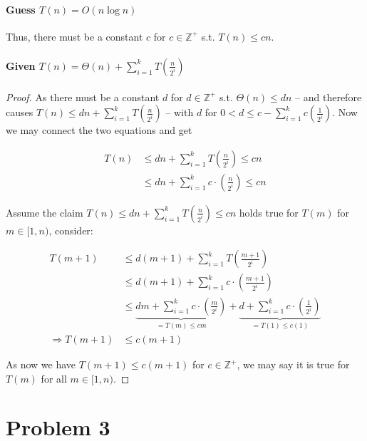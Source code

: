 \documentclass[11pt]{article}
\begin{document}
\paragraph{Guess $T(n) = O(n \log n)$\newline}
Thus, there must be a constant $c$ for $c \in \mathbb{Z^+}$ s.t. $T(n) \leq cn$.

\paragraph{Given $T(n) = \Theta(n) + \sum^{k}_{i = 1} T(\frac{n}{2^i})$\newline}
\begin{proof}
As there must be a constant $d$ for $d \in \mathbb{Z^+}$ s.t. $\Theta(n) \leq dn$ -- and therefore causes $T(n) \leq dn + \sum^{k}_{i = 1} T(\frac{n}{2^i})$ -- with $d$ for $0 < d \leq c - \sum^{k}_{i = 1} c(\frac{1}{2^i})$. Now we may connect the two equations and get

\begin{align}
    T(n) &\leq dn + \sum^{k}_{i = 1} T(\frac{n}{2^i}) \leq cn \\
    &\leq dn + \sum^{k}_{i = 1} c \cdot (\frac{n}{2^i}) \leq cn \nonumber
\end{align}

Assume the claim $T(n) \leq dn + \sum^{k}_{i = 1} T(\frac{n}{2^i}) \leq cn$ holds true for $T(m)$ for $m \in [1, n)$, consider:

\begin{align}
    T(m+1) &\leq d(m + 1) + \sum^{k}_{i = 1} T(\frac{m+1}{2^i}) \\
    &\leq d(m + 1) + \sum^{k}_{i = 1} c \cdot (\frac{m+1}{2^i}) \nonumber \\
    &\leq \underbrace{dm + \sum^{k}_{i = 1} c \cdot (\frac{m}{2^i})}_{= T(m) \leq cm} + \underbrace{d + \sum^{k}_{i = 1} c \cdot (\frac{1}{2^i})}_{= T(1) \leq c(1)} \\
    \Longrightarrow T(m+1) &\leq c(m+1)
\end{align}


As now we have $T(m+1) \leq c(m+1)$ for $c \in \mathbb{Z^+}$, we may say it is true for $T(m)$ for all $m \in [1, n)$.
\end{proof}


\section{Problem 3}
\end{document}
